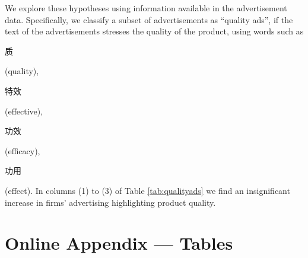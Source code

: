 \documentclass[12pt]{article}
\begin{document}
We explore these hypotheses using information available in the advertisement data. Specifically, we classify a subset of advertisements as ``quality ads'', if the text of the advertisements stresses the quality of the product, using words  such as \begin{CJK*}{UTF8}{gbsn} 质\end{CJK*} (quality), \begin{CJK*}{UTF8}{gbsn}特效\end{CJK*} (effective), \begin{CJK*}{UTF8}{gbsn}功效\end{CJK*} (efficacy), \begin{CJK*}{UTF8}{gbsn}功用\end{CJK*} (effect). In columns (1) to (3) of Table \ref{tab:qualityads} we find an insignificant increase in  firms' advertising highlighting product quality.

\newpage

\section{Online Appendix --- Tables}

\begin{table}[hbt!]
	\centering
	\caption{Summary statistics}
	    \label{tab:summarystat}
\end{table}
\end{document}
